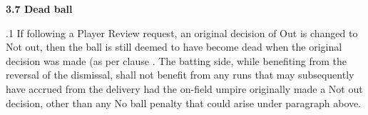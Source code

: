 \documentclass[12pt]{article}
\begin{document}

\par 

\vspace{\baselineskip}

\vspace{\baselineskip}

\vspace{\baselineskip}

\vspace{\baselineskip}

\vspace{\baselineskip}

\vspace{\baselineskip}

\vspace{\baselineskip}
\begin{adjustwidth}{0.0in}{0.08in}
\begin{Center}
{\fontsize{8pt}{9.6pt}\par}
\end{Center}\par

\end{adjustwidth}


\vspace{\baselineskip}
{\fontsize{11pt}{13.2pt}\selectfont \textbf{3.7 \tabto{0.47in} Dead ball}\par}\par


\vspace{\baselineskip}
\begin{adjustwidth}{0.5in}{0.19in}
{\fontsize{9pt}{10.8pt}.1 \tabto{0.49in} If following a Player Review request, an original decision of Out is changed to Not out, then the ball is still deemed to have become dead when the original decision was made (as per clause . The batting side, while benefiting from the reversal of the dismissal, shall not benefit from any runs that may subsequently have accrued from the delivery had the on-field umpire originally made a Not out decision, other than any No ball penalty that could arise under paragraph above.\par}\par

\end{adjustwidth}
\end{document}
